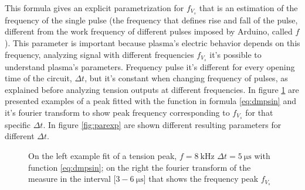 This formula gives an explicit parametrization for $f_{V_{s}}$ that is an estimation of the frequency of the single pulse (the frequency that defines rise and fall of the pulse, different from the work frequency of different pulses imposed by Arduino, called $f$). This parameter is important because plasma's electric behavior depends on this frequency, analyzing signal with different frequencies $f_{V_{s}}$ it's possible to understand plasma's parameters. Frequency pulse it's different for every opening time of the circuit, $\Delta t$, but it's constant when changing frequency of pulses, as explained before analyzing tension outputs at different frequencies. In figure \ref{fig:fitexp} are presented examples of a peak fitted with the function in formula \ref{eq:dmpsin} and it's fourier transform to show peak frequency corresponding to $f_{V_s}$ for that specific $\Delta t$. In figure \ref{fig:parexp} are shown different resulting parameters for different $\Delta t$.

\begin{figure}
 \centering
 \caption{On the left example fit of a tension peak, $f = \SI{8}{\kilo\hertz}$ $\Delta t = \SI{5}{\micro\second}$ with function \ref{eq:dmpsin}; on the right the fourier transform of the measure in the interval [$3-\SI{6}{\micro\second}$] that shows the frequency peak $f_{V_s}$}
 \label{fig:fitexp}
\end{figure}

